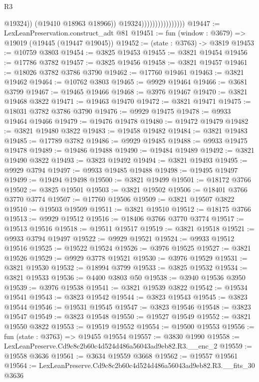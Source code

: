 \begin{lexlean}{R3}
\begin{coremodule}
                                          @19324))
                                      (@19410 @18963 @18966))
                                    @19324))))))))))))))))
@19447 := LexLeanPreservation.construct_adt @81
@19451 := fun (window : @3679) => @19019 (@19445 (@19447 @19045))
@19452 := (state : @3763) -> @3819
@19453 := @10759 @3803
@19454 := @3825 @19453
@19455 := @3821 @19454
@19456 := @17786 @3782
@19457 := @3825 @19456
@19458 := @3821 @19457
@19461 := @18026 @3782 @3786 @3790
@19462 := @17760 @19461
@19463 := @3821 @19462
@19464 := @10762 @3803
@19465 := @9929 @19464
@19466 := @3681 @3799
@19467 := @19465 @19466
@19468 := @3976 @19467
@19470 := @3821 @19468 @3822
@19471 := @19463 @19470
@19472 := @3821 @19471
@19475 := @18031 @3782 @3786 @3790
@19476 := @9929 @19475
@19478 := @9933 @19464 @19466
@19479 := @19476 @19478
@19480 := @19472 @19479
@19482 := @3821 @19480 @3822
@19483 := @19458 @19482
@19484 := @3821 @19483
@19485 := @17789 @3782
@19486 := @9929 @19485
@19488 := @9933 @19475 @19478
@19489 := @19486 @19488
@19490 := @19484 @19489
@19492 := @3821 @19490 @3822
@19493 := @3823 @19492
@19494 := @3821 @19493
@19495 := @9929 @3794
@19497 := @9933 @19485 @19488
@19498 := @19495 @19497
@19499 := @19494 @19498
@19500 := @3821 @19499
@19501 := @18172 @3766
@19502 := @3825 @19501
@19503 := @3821 @19502
@19506 := @18401 @3766 @3770 @3774
@19507 := @17760 @19506
@19509 := @3821 @19507 @3822
@19510 := @19503 @19509
@19511 := @3821 @19510
@19512 := @18175 @3766
@19513 := @9929 @19512
@19516 := @18406 @3766 @3770 @3774
@19517 := @19513 @19516
@19518 := @19511 @19517
@19519 := @3821 @19518
@19521 := @9933 @3794 @19497
@19522 := @9929 @19521
@19524 := @9933 @19512 @19516
@19525 := @19522 @19524
@19526 := @3976 @19525
@19527 := @3821 @19526
@19529 := @9929 @3778 @19521
@19530 := @3976 @19529
@19531 := @3821 @19530
@19532 := @18994 @3799
@19533 := @3825 @19532
@19534 := @3821 @19533
@19536 := @4400 @3803 @50
@19538 := @3940 @19536 @3950
@19539 := @3976 @19538
@19541 := @3821 @19539 @3822
@19542 := @19534 @19541
@19543 := @3823 @19542
@19544 := @3823 @19543
@19545 := @3823 @19544
@19546 := @19531 @19545
@19547 := @3823 @19546
@19548 := @3823 @19547
@19549 := @3823 @19548
@19550 := @19527 @19549
@19552 := @3821 @19550 @3822
@19553 := @19519 @19552
@19554 := @19500 @19553
@19556 := fun (state : @3763) => @19455 @19554
@19557 := @3830 @1990
@19558 := LexLeanPreserve.Cd9c8c2b60c4d524d486a56043ad9eb82.R3.__enc_2
@19559 := @19558 @3636
@19561 := @3634 @19559 @3668
@19562 := @19557 @19561
@19564 := LexLeanPreserve.Cd9c8c2b60c4d524d486a56043ad9eb82.R3.__fits_30 @3636

\end{coremodule}
\end{lexlean}
